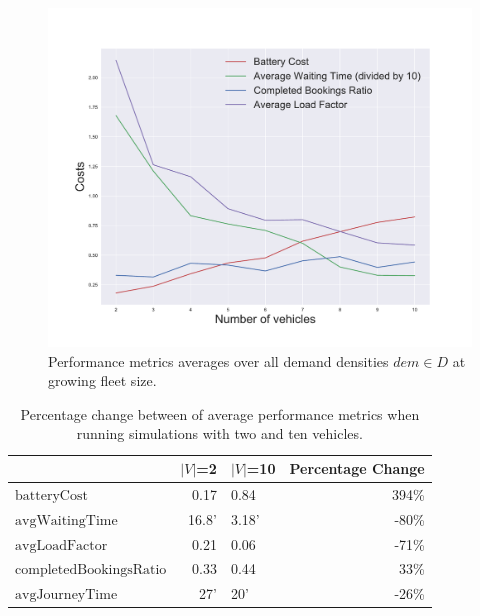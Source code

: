 \documentclass[12pt,a4paper]{article}
\begin{document}
\begin{figure}
  \centering
\includegraphics[scale=0.5]{./images/vehicleimpact.pdf}
  \caption{Performance metrics averages over all demand densities $dem \in D$ at growing fleet size.}
\label{averages}
\end{figure}


\begin{table}[h]
\caption{Percentage change between of average performance metrics when running simulations with two and ten vehicles.}
\center
    \begin{tabular}{|l|r|l|r|}
      \toprule
    & $|V|$=2 & $|V|$=10 & Percentage Change\\
    \midrule
    $\text{batteryCost}$ & 0.17 & 0.84 & 394\%\\
    $\text{avgWaitingTime}$ & 16.8' & 3.18' & -80\% \\
    $\text{avgLoadFactor}$ & 0.21 & 0.06 & -71\% \\
    $\text{completedBookingsRatio}$ & 0.33 & 0.44 & 33\% \\
    $\text{avgJourneyTime}$ & 27' & 20' & -26\% \\
    \midrule
    \end{tabular}
    \label{averageschange}
  \end{table}
  
\end{document}
